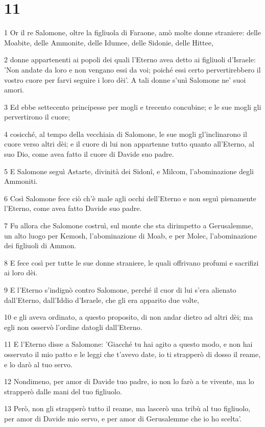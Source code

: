 \chapter{11}

\par 1 Or il re Salomone, oltre la figliuola di Faraone, amò molte donne straniere: delle Moabite, delle Ammonite, delle Idumee, delle Sidonie, delle Hittee,
\par 2 donne appartenenti ai popoli dei quali l'Eterno avea detto ai figliuoli d'Israele: 'Non andate da loro e non vengano essi da voi; poiché essi certo pervertirebbero il vostro cuore per farvi seguire i loro dèi'. A tali donne s'unì Salomone ne' suoi amori.
\par 3 Ed ebbe settecento principesse per mogli e trecento concubine; e le sue mogli gli pervertirono il cuore;
\par 4 cosicché, al tempo della vecchiaia di Salomone, le sue mogli gl'inclinarono il cuore verso altri dèi; e il cuore di lui non appartenne tutto quanto all'Eterno, al suo Dio, come avea fatto il cuore di Davide suo padre.
\par 5 E Salomone seguì Astarte, divinità dei Sidonî, e Milcom, l'abominazione degli Ammoniti.
\par 6 Così Salomone fece ciò ch'è male agli occhi dell'Eterno e non seguì pienamente l'Eterno, come avea fatto Davide suo padre.
\par 7 Fu allora che Salomone costruì, sul monte che sta dirimpetto a Gerusalemme, un alto luogo per Kemosh, l'abominazione di Moab, e per Molec, l'abominazione dei figliuoli di Ammon.
\par 8 E fece così per tutte le sue donne straniere, le quali offrivano profumi e sacrifizi ai loro dèi.
\par 9 E l'Eterno s'indignò contro Salomone, perché il cuor di lui s'era alienato dall'Eterno, dall'Iddio d'Israele, che gli era apparito due volte,
\par 10 e gli aveva ordinato, a questo proposito, di non andar dietro ad altri dèi; ma egli non osservò l'ordine datogli dall'Eterno.
\par 11 E l'Eterno disse a Salomone: 'Giacché tu hai agito a questo modo, e non hai osservato il mio patto e le leggi che t'avevo date, io ti strapperò di dosso il reame, e lo darò al tuo servo.
\par 12 Nondimeno, per amor di Davide tuo padre, io non lo farò a te vivente, ma lo strapperò dalle mani del tuo figliuolo.
\par 13 Però, non gli strapperò tutto il reame, ma lascerò una tribù al tuo figliuolo, per amor di Davide mio servo, e per amor di Gerusalemme che io ho scelta'.
